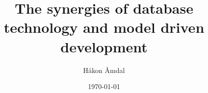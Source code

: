 \title{The synergies of database technology and model driven development}
\author{Håkon Åmdal}
\date{\today}
